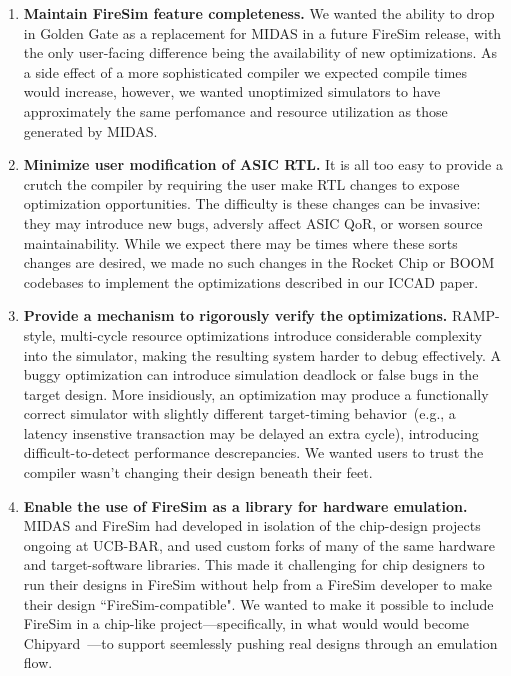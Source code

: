 \begin{enumerate}
\item \textbf{Maintain FireSim feature completeness.} We wanted the ability to
drop in Golden Gate as a replacement for MIDAS in a future FireSim release, with the
only user-facing difference being the availability of new
optimizations. As a side effect of a more sophisticated compiler we expected
compile times would increase, however, we wanted unoptimized simulators to have
approximately the same perfomance and resource utilization as those generated by MIDAS.

\item \textbf{Minimize user modification of ASIC RTL.} It is all too easy to
provide a crutch the compiler by requiring the user make RTL changes to expose
optimization opportunities. The difficulty is these changes can be
invasive: they may introduce new bugs, adversly affect ASIC QoR, or worsen source maintainability. While we expect there
may be times where these sorts changes are desired, we made no such
changes in the Rocket Chip or BOOM codebases to implement the optimizations
described in our ICCAD paper.

\item \textbf{Provide a mechanism to rigorously verify the optimizations.} RAMP-style, multi-cycle resource optimizations introduce considerable complexity into the
simulator, making the resulting system harder to debug
effectively. A buggy optimization can introduce simulation deadlock or false
bugs in the target design.
More insidiously, an optimization may produce a functionally correct simulator with slightly
different target-timing behavior~(e.g., a latency insenstive transaction may be delayed an extra cycle), introducing difficult-to-detect performance
descrepancies. We wanted users to trust the compiler wasn't changing their
design beneath their feet.

\item \textbf{Enable the use of FireSim as a library for hardware emulation.}
MIDAS and FireSim had developed in isolation of the chip-design projects
ongoing at UCB-BAR, and used custom forks of many of the same hardware and
target-software libraries. This made it challenging for chip designers to run
their designs in FireSim without help from a FireSim developer to make their design ``FireSim-compatible". We
wanted to make it possible to include FireSim in a chip-like project---specifically, in what would
would become Chipyard~\cite{Chipyard}---to support seemlessly pushing real
designs through an emulation flow.
\end{enumerate}

